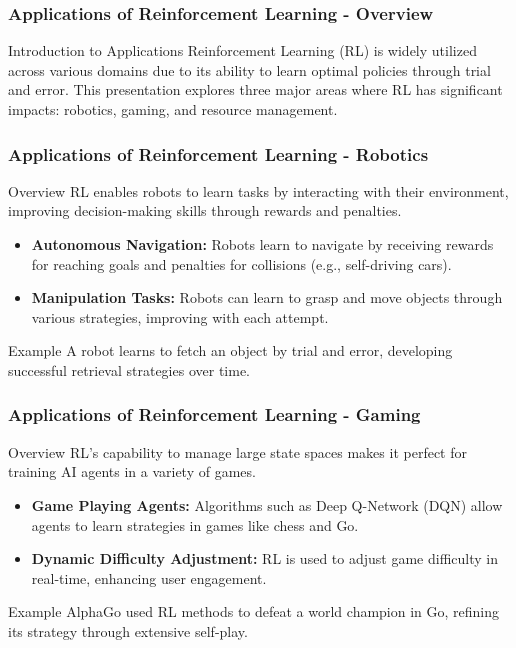 \documentclass[aspectratio=169]{beamer}
\begin{document}
\begin{frame}[fragile]
    \frametitle{Applications of Reinforcement Learning - Overview}
    \begin{block}{Introduction to Applications}
        Reinforcement Learning (RL) is widely utilized across various domains due to its ability to learn optimal policies through trial and error. This presentation explores three major areas where RL has significant impacts: robotics, gaming, and resource management.
    \end{block}
\end{frame}

\begin{frame}[fragile]
    \frametitle{Applications of Reinforcement Learning - Robotics}
    \begin{block}{Overview}
        RL enables robots to learn tasks by interacting with their environment, improving decision-making skills through rewards and penalties.
    \end{block}

    \begin{itemize}
        \item \textbf{Autonomous Navigation:} 
        Robots learn to navigate by receiving rewards for reaching goals and penalties for collisions (e.g., self-driving cars).
        
        \item \textbf{Manipulation Tasks:}
        Robots can learn to grasp and move objects through various strategies, improving with each attempt.
    \end{itemize}

    \begin{block}{Example}
        A robot learns to fetch an object by trial and error, developing successful retrieval strategies over time.
    \end{block}
\end{frame}

\begin{frame}[fragile]
    \frametitle{Applications of Reinforcement Learning - Gaming}
    \begin{block}{Overview}
        RL's capability to manage large state spaces makes it perfect for training AI agents in a variety of games.
    \end{block}

    \begin{itemize}
        \item \textbf{Game Playing Agents:} 
        Algorithms such as Deep Q-Network (DQN) allow agents to learn strategies in games like chess and Go.
        
        \item \textbf{Dynamic Difficulty Adjustment:}
        RL is used to adjust game difficulty in real-time, enhancing user engagement.
    \end{itemize}

    \begin{block}{Example}
        AlphaGo used RL methods to defeat a world champion in Go, refining its strategy through extensive self-play.
    \end{block}
\end{frame}
\end{document}
